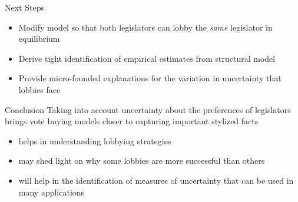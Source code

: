 \documentclass{beamer}
\begin{document}
\begin{frame}{Next Steps}
\pause
\begin{itemize}[<+->]
	\item Modify model so that both legislators can lobby the \textit{same} legislator in equilibrium
	\item Derive tight identification of empirical estimates from structural model
	\item Provide micro-founded explanations for the variation in uncertainty that lobbies face
\end{itemize}

\end{frame}


\begin{frame}{Conclusion}
Taking into account uncertainty about the preferences of legislators brings vote buying models closer to capturing important stylized facts
\pause
\begin{itemize}[<+->]
		\item helps in understanding lobbying strategies
		\item may shed light on why some lobbies are more successful than others
		\item will help in the identification of measures of uncertainty that can be used in many applications
\end{itemize}

\end{frame}
\end{document}
